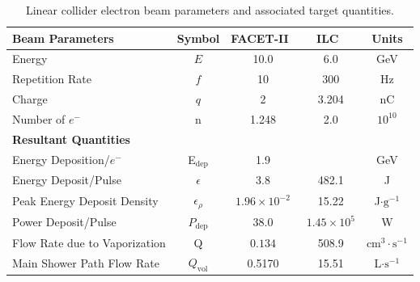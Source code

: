 \documentclass[%
reprint,
nofootinbib,
amsmath, amssymb,
aps,
floatfix,
]{revtex4-2}
\begin{document}
\begin{table}
    \centering
    \begin{tabular}{lcccc}
        \hline \hline
        \textbf{Beam Parameters} & \textbf{Symbol} & \textbf{FACET-II}~\cite{FACET2016} & \textbf{ILC}~\cite{Seimiya2015} & \textbf{Units} \\
        \hline
        Energy & $E$ & 10.0 & 6.0 & GeV \\
        Repetition Rate & $f$ & 10 & 300 & Hz \\
        Charge & $q$ & 2 & 3.204 & nC \\
        Number of $e^-$ & n & 1.248 & 2.0 & $10^{10}$ \\
        \hline \hline
        \textbf{Resultant Quantities} \\
        \hline
        Energy Deposition/$e^-$ & E$_{\textrm{dep}}$ & 1.9 & & GeV \\
        Energy Deposit/Pulse & $\epsilon$ & 3.8 & 482.1 & J \\
        Peak Energy Deposit Density & $\epsilon_\rho$ & $1.96\times 10^{-2}$ & 15.22 & J$\cdot\textrm{g}^{-1}$ \\
        Power Deposit/Pulse & $P_\textrm{dep}$ & $38.0$ & $1.45\times 10^5$ & W \\
        Flow Rate due to Vaporization & Q & $0.134$ & 508.9 & cm$^3\cdot \textrm{s}^{-1}$ \\
        Main Shower Path Flow Rate & $Q_\textrm{vol}$ & 0.5170 & 15.51 & L$\cdot \textrm{s}^{-1}$ \\
        \hline \hline
    \end{tabular}
    \caption{\label{tab:BeamInfo}Linear collider electron beam parameters and associated target quantities.}
\end{table}
\end{document}
